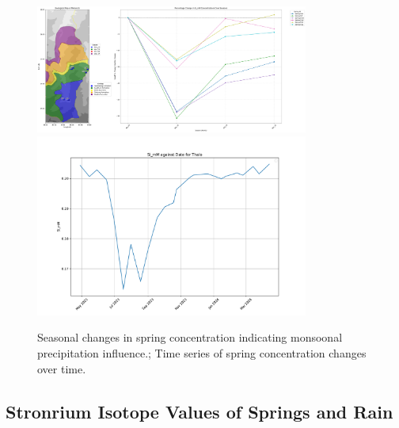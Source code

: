 \begin{figure}[h]
    \centering
    \includegraphics[width=0.8\textwidth]{Si_mM_percentage_change_springs.pdf}
    \includegraphics[width=0.8\textwidth]{Si_mM_Thalo_timeseries.pdf}
    \caption{Seasonal changes in spring concentration indicating monsoonal precipitation influence.; Time series of spring concentration changes over time.}
    \label{fig:time_series_changes}
\end{figure}

\FloatBarrier


\subsection{Stronrium Isotope Values of Springs and Rain}



